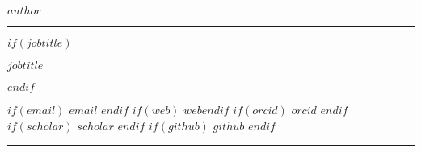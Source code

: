 
\centerline{\Huge \bf $author$}

\vspace{2mm}
\hrule
\vspace{2mm}

$if(jobtitle)$\centerline{$jobtitle$}$endif$

\centerline{
  $if(email)$\faEnvelope \hspace{1mm} \href{mailto:}{\tt $email$} \hspace{1mm}$endif$
  $if(web)$\faGlobe \hspace{1mm} \href{https://$web$}{\tt $web$}$endif$
  $if(orcid)$ \hspace{.5mm} \href{https://orcid.org/$orcid$}{\tt $orcid$} \hspace{1mm}$endif$
  $if(scholar)$\aiGoogleScholar \hspace{1mm} \href{https://scholar.google.com/citations?user=$scholar$}{\tt $scholar$} \hspace{1mm}$endif$
  $if(github)$\faGithub \hspace{1mm} \href{http://github.com/$github$}{\tt $github$} \hspace{1mm}$endif$
}

\vspace{2mm}
\hrule
\vspace{4mm}
